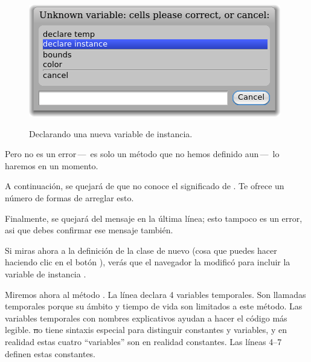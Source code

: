 \documentclass[a4paper,10pt,twoside]{book}
\begin{document}
\begin{figure}[htb]
\begin{minipage}{0.48\textwidth}
		{\includegraphics[scale=0.7]{DeclareInstanceVar}}
	\caption{Declarando una nueva variable de instancia.}
\end{minipage}
\end{figure}

Pero  no es un error\,---\, es solo un m\'etodo que no hemos definido aun\,---\, lo haremos en un momento.


A continuaci\'on, \pharo se quejar\'a de que no conoce el significado de . Te ofrece un n\'umero de formas de arreglar esto. 

Finalmente, \pharo se quejar\'a del mensaje  en la \'ultima l\'inea; esto tampoco es un error, asi que debes confirmar ese mensaje tambi\'en.

Si miras ahora a la definici\'on de la clase de nuevo (cosa que puedes hacer haciendo clic en el bot\'on ), ver\'as que el navegador la modific\'o para incluir la variable de instancia .

Miremos ahora al m\'etodo .
La l\'inea  declara 4 variables temporales. Son llamadas temporales porque su \'ambito y tiempo de vida son limitados a este m\'etodo. Las variables temporales con nombres explicativos ayudan a hacer el c\'odigo m\'as legible. \st no tiene sintaxis especial para distinguir constantes y variables, y en realidad estas cuatro ``variables'' son en realidad constantes.
Las l\'ineas 4--7 definen estas constantes.
\end{document}
